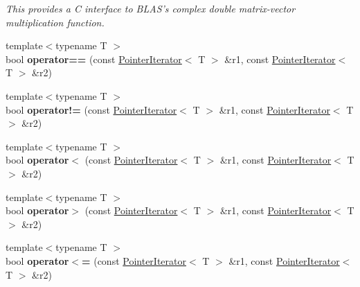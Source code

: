 \begin{DoxyCompactItemize}
\begin{DoxyCompactList}\small\item\em This provides a C interface to B\-L\-A\-S's complex double matrix-\/vector multiplication function. \end{DoxyCompactList}\item 
\hypertarget{namespacekeycpp_adfb32fd99bb09455f5a124df4560ab0f}{{\footnotesize template$<$typename T $>$ }\\bool {\bfseries operator==} (const \hyperlink{classkeycpp_1_1_pointer_iterator}{Pointer\-Iterator}$<$ T $>$ \&r1, const \hyperlink{classkeycpp_1_1_pointer_iterator}{Pointer\-Iterator}$<$ T $>$ \&r2)}\label{namespacekeycpp_adfb32fd99bb09455f5a124df4560ab0f}

\item 
\hypertarget{namespacekeycpp_a9358d5f3f08dd8ed262697b7e8b2a4f1}{{\footnotesize template$<$typename T $>$ }\\bool {\bfseries operator!=} (const \hyperlink{classkeycpp_1_1_pointer_iterator}{Pointer\-Iterator}$<$ T $>$ \&r1, const \hyperlink{classkeycpp_1_1_pointer_iterator}{Pointer\-Iterator}$<$ T $>$ \&r2)}\label{namespacekeycpp_a9358d5f3f08dd8ed262697b7e8b2a4f1}

\item 
\hypertarget{namespacekeycpp_a689a724b505d52660e42e1148eba1a9a}{{\footnotesize template$<$typename T $>$ }\\bool {\bfseries operator$<$} (const \hyperlink{classkeycpp_1_1_pointer_iterator}{Pointer\-Iterator}$<$ T $>$ \&r1, const \hyperlink{classkeycpp_1_1_pointer_iterator}{Pointer\-Iterator}$<$ T $>$ \&r2)}\label{namespacekeycpp_a689a724b505d52660e42e1148eba1a9a}

\item 
\hypertarget{namespacekeycpp_a7330eaaa701d2308c19f84adda097685}{{\footnotesize template$<$typename T $>$ }\\bool {\bfseries operator$>$} (const \hyperlink{classkeycpp_1_1_pointer_iterator}{Pointer\-Iterator}$<$ T $>$ \&r1, const \hyperlink{classkeycpp_1_1_pointer_iterator}{Pointer\-Iterator}$<$ T $>$ \&r2)}\label{namespacekeycpp_a7330eaaa701d2308c19f84adda097685}

\item 
\hypertarget{namespacekeycpp_a9b02f40e92cad47b419ac09207518b9f}{{\footnotesize template$<$typename T $>$ }\\bool {\bfseries operator$<$=} (const \hyperlink{classkeycpp_1_1_pointer_iterator}{Pointer\-Iterator}$<$ T $>$ \&r1, const \hyperlink{classkeycpp_1_1_pointer_iterator}{Pointer\-Iterator}$<$ T $>$ \&r2)}\label{namespacekeycpp_a9b02f40e92cad47b419ac09207518b9f}


\end{DoxyCompactItemize}
